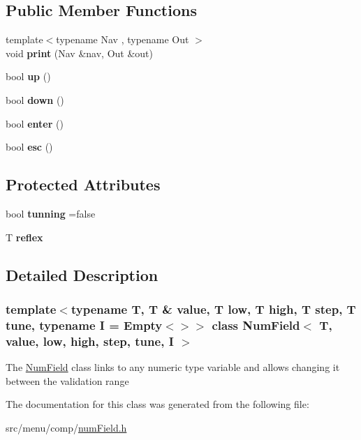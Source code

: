 \subsection*{Public Member Functions}
\begin{DoxyCompactItemize}
\item 
\mbox{\label{classNumField_a59741302593e27f69c061f13572d8b73}} 
{\footnotesize template$<$typename Nav , typename Out $>$ }\\void {\bfseries print} (Nav \&nav, Out \&out)
\item 
\mbox{\label{classNumField_a4f3b892335a275c356e1637c6353efa7}} 
bool {\bfseries up} ()
\item 
\mbox{\label{classNumField_aa8ab4efc861b39c41333a22b1089b06f}} 
bool {\bfseries down} ()
\item 
\mbox{\label{classNumField_aaa94dd7ee3cc9a75c78847bcf50cf4b1}} 
bool {\bfseries enter} ()
\item 
\mbox{\label{classNumField_a3488e09f76eed5b6937516033b1af0f9}} 
bool {\bfseries esc} ()
\end{DoxyCompactItemize}
\subsection*{Protected Attributes}
\begin{DoxyCompactItemize}
\item 
\mbox{\label{classNumField_aa6214daa8e0081fc25e2e366a40be7ab}} 
bool {\bfseries tunning} =false
\item 
\mbox{\label{classNumField_abd57d5ad6ade75a1319893111210b215}} 
T {\bfseries reflex}
\end{DoxyCompactItemize}


\subsection{Detailed Description}
\subsubsection*{template$<$typename T, T \& value, T low, T high, T step, T tune, typename I = Empty$<$$>$$>$\newline
class Num\+Field$<$ T, value, low, high, step, tune, I $>$}

The \hyperlink{classNumField}{Num\+Field} class links to any numeric type variable and allows changing it between the validation range 

The documentation for this class was generated from the following file\+:\begin{DoxyCompactItemize}
\item 
src/menu/comp/\hyperlink{numField_8h}{num\+Field.\+h}\end{DoxyCompactItemize}
